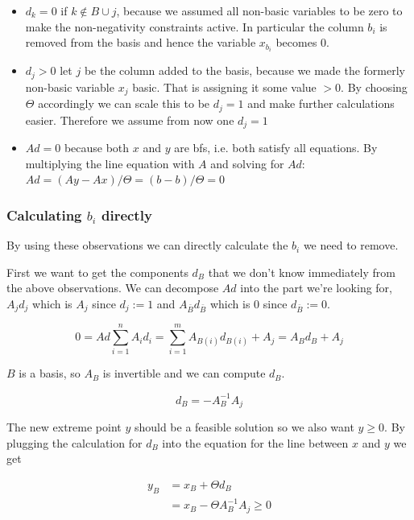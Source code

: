 \begin{itemize}
\item $d_k=0$ if $k\not \in B \cup j$, because we assumed all non-basic variables to be zero to make the non-negativity constraints active. In particular the column $b_i$ is removed from the basis and hence the variable $x_{b_i}$ becomes $0$.

\item $d_j>0$ let $j$ be the column added to the basis, because we made the formerly non-basic variable $x_j$ basic. That is assigning it some value $>0$. By choosing $\Theta$ accordingly we can scale this to be $d_j=1$ and make further calculations easier. Therefore we assume from now one $d_j=1$

\item $Ad = 0$ because both $x$ and $y$ are bfs, i.e. both satisfy all equations. By multiplying the line equation with $A$ and solving for $Ad$: $Ad = (Ay-Ax)/\Theta = (b-b)/\Theta = 0$
\end{itemize}

\subsubsection*{Calculating $b_i$ directly}
By using these observations we can directly calculate the $b_i$ we need to remove.

First we want to get the components $d_B$ that we don't know immediately from the above observations. We can decompose $Ad$ into the part we're looking for, $A_j d_j$ which is $A_j$ since $d_j:=1$ and $A_{\bar B} d_{\bar B}$ which is 0 since $d_{\bar B}:=0$.

\[0= Ad \sum_{i=1}^{n}A_i d_i  = \sum_{i=1}^{m}{A_{B(i)} d_{B(i)}} + A_j = A_B d_B + A_j\]

$B$ is a basis, so $A_B$ is invertible and we can compute $d_B$.

\begin{equation}
d_B = -A^{-1}_B A_j \label{equ:valueDb}
\end{equation}

The new extreme point $y$ should be a feasible solution so we also want $y\geq 0$. By plugging the calculation for $d_B$ into the equation for the line between $x$ and $y$ we get

\begin{align*}
y_B &= x_B + \Theta d_B\\
 &= x_B - \Theta A_B^{-1} A_j \geq 0
\end{align*}

